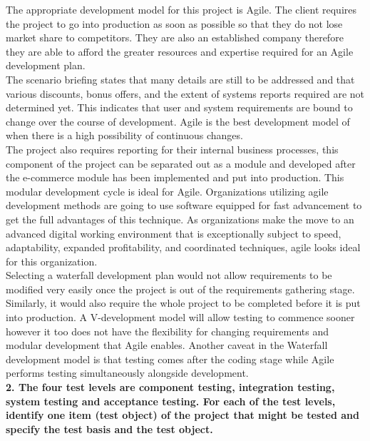 \documentclass[a4paper,man,natbib]{apa6}
\begin{document}
The appropriate development model for this project is Agile. The client requires the project to go into production as soon as possible so that they do not lose market share to competitors. They are also an established company therefore they are able to afford the greater resources and expertise required for an Agile development plan.\\
The scenario briefing states that many details are still to be addressed and that various discounts, bonus offers, and the extent of systems reports required are not determined yet. This indicates that user and system requirements are bound to change over the course of development. Agile is the best development model of when there is a high possibility of continuous changes.\\
The project also requires reporting for their internal business processes, this component of the project can be separated out as a module and developed after the e-commerce module has been implemented and put into production. This modular development cycle is ideal for Agile.
Organizations utilizing agile development methods are going to use software equipped for fast advancement to get the full advantages of this technique. As organizations make the move to an advanced digital working environment that is exceptionally subject to speed, adaptability, expanded profitability, and coordinated techniques, agile looks ideal for this organization. \citep{Alexander2018} \\
Selecting a waterfall development plan would not allow requirements to be modified very easily once the project is out of the requirements gathering stage. Similarly, it would also require the whole project to be completed before it is put into production. A V-development model will allow testing to commence sooner however it too does not have the flexibility for changing requirements and modular development that Agile enables. Another caveat in the Waterfall development model is that testing comes after the coding stage while Agile performs testing simultaneously alongside development. \\

\pagebreak
\noindent
\textbf{2. The four test levels are component testing, integration testing, system testing and acceptance testing.  For each of the test levels, identify one item (test object) of the project that might be tested and specify the test basis and the test object.}\\
\end{document}
